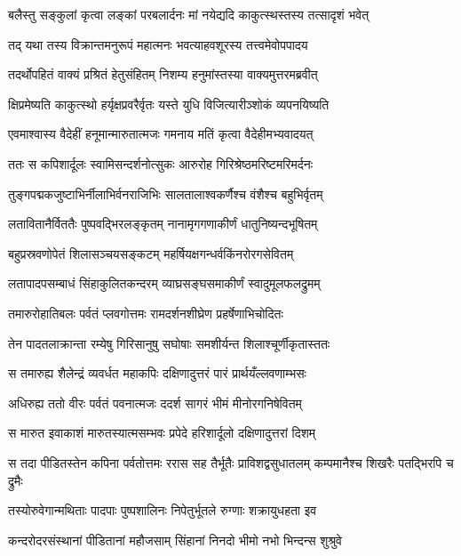 \twolineshloka
{बलैस्तु सङ्कुलां कृत्वा लङ्कां परबलार्दनः}
{मां नयेद्यदि काकुत्स्थस्तस्य तत्सादृशं भवेत्} %

\twolineshloka
{तद् यथा तस्य विक्रान्तमनुरूपं महात्मनः}
{भवत्याहवशूरस्य तत्त्वमेवोपपादय} %

\twolineshloka
{तदर्थोपहितं वाक्यं प्रश्रितं हेतुसंहितम्}
{निशम्य हनुमांस्तस्या वाक्यमुत्तरमब्रवीत्} %

\twolineshloka
{क्षिप्रमेष्यति काकुत्स्थो हर्यृक्षप्रवरैर्वृतः}
{यस्ते युधि विजित्यारीञ्शोकं व्यपनयिष्यति} %

\twolineshloka
{एवमाश्वास्य वैदेहीं हनूमान्मारुतात्मजः}
{गमनाय मतिं कृत्वा वैदेहीमभ्यवादयत्} %

\twolineshloka
{ततः स कपिशार्दूलः स्वामिसन्दर्शनोत्सुकः}
{आरुरोह गिरिश्रेष्ठमरिष्टमरिमर्दनः} %

\twolineshloka
{तुङ्गपद्मकजुष्टाभिर्नीलाभिर्वनराजिभिः}
{सालतालाश्वकर्णैश्च वंशैश्च बहुभिर्वृतम्} %

\twolineshloka
{लतावितानैर्विततैः पुष्पवद्भिरलङ्कृतम्}
{नानामृगगणाकीर्णं धातुनिष्यन्दभूषितम्} %

\twolineshloka
{बहुप्रस्रवणोपेतं शिलासञ्चयसङ्कटम्}
{महर्षियक्षगन्धर्वकिंनरोरगसेवितम्} %

\twolineshloka
{लतापादपसम्बाधं सिंहाकुलितकन्दरम्}
{व्याघ्रसङ्घसमाकीर्णं स्वादुमूलफलद्रुमम्} %

\twolineshloka
{तमारुरोहातिबलः पर्वतं प्लवगोत्तमः}
{रामदर्शनशीघ्रेण प्रहर्षेणाभिचोदितः} %

\twolineshloka
{तेन पादतलाक्रान्ता रम्येषु गिरिसानुषु}
{सघोषाः समशीर्यन्त शिलाश्चूर्णीकृतास्ततः} %

\twolineshloka
{स तमारुह्य शैलेन्द्रं व्यवर्धत महाकपिः}
{दक्षिणादुत्तरं पारं प्रार्थयँल्लवणाम्भसः} %

\twolineshloka
{अधिरुह्य ततो वीरः पर्वतं पवनात्मजः}
{ददर्श सागरं भीमं मीनोरगनिषेवितम्} %

\twolineshloka
{स मारुत इवाकाशं मारुतस्यात्मसम्भवः}
{प्रपेदे हरिशार्दूलो दक्षिणादुत्तरां दिशम्} %

\threelineshloka
{स तदा पीडितस्तेन कपिना पर्वतोत्तमः}
{ररास सह तैर्भूतैः प्राविशद्वसुधातलम्}
{कम्पमानैश्च शिखरैः पतद्भिरपि च द्रुमैः} %

\twolineshloka
{तस्योरुवेगान्मथिताः पादपाः पुष्पशालिनः}
{निपेतुर्भूतले रुग्णाः शक्रायुधहता इव} %

\twolineshloka
{कन्दरोदरसंस्थानां पीडितानां महौजसाम्}
{सिंहानां निनदो भीमो नभो भिन्दन्स शुश्रुवे} %

